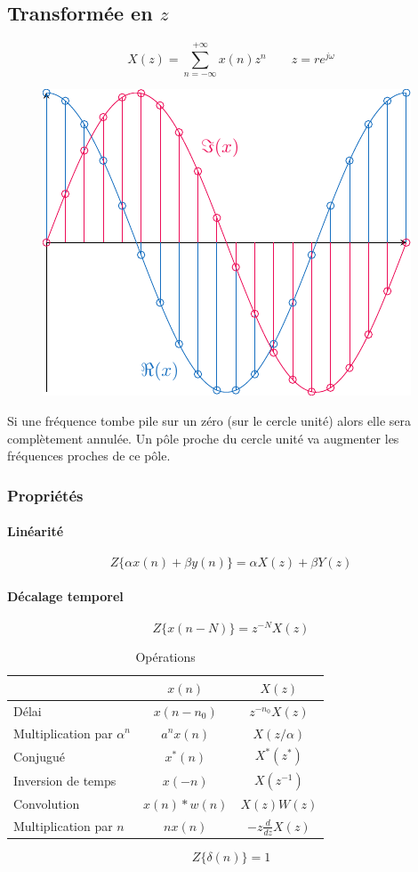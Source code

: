 \documentclass[resume]{subfiles}
\begin{document}
\subsection{Transformée en $z$}
$$X(z)=\sum_{n=-\infty}^{+\infty}x(n)z^{n}\qquad z=re^{j\omega}$$
\begin{figure}[H]
\centering
\includegraphics[width=0.9\columnwidth,page=3]{drwg_2.pdf}
\end{figure}
Si une fréquence tombe pile sur un zéro (sur le cercle unité) alors elle sera complètement annulée. Un pôle proche du cercle unité va augmenter les fréquences proches de ce pôle.
\subsubsection{Propriétés}
\paragraph{Linéarité}
$$Z\lbrace \alpha x(n)+\beta y(n)\rbrace=\alpha X(z)+\beta Y(z)$$
\paragraph{Décalage temporel}
$$Z\lbrace x(n-N)\rbrace=z^{-N}X(z)$$
\begin{table}[H]
\begin{tabular}{lcc}
 & $x(n)$ & $X(z)$\\\hline
Délai & $x(n-n_0)$ & $z^{-n_0}X(z)$\\
Multiplication par $\alpha^{n}$ & $a^{n}x(n)$ & $X(z/\alpha)$\\
Conjugué & $x^\ast(n)$ & $X^\ast(z^\ast)$\\
Inversion de temps & $x(-n)$ & $X(z^{-1})$\\
Convolution & $x(n)*w(n)$ & $X(z)W(z)$\\
Multiplication par $n$ & $nx(n)$ & $-z\frac{d}{dz}X(z)$
\end{tabular}
\caption{Opérations}
\end{table}
$$Z\lbrace\delta(n)\rbrace=1$$
\end{document}
